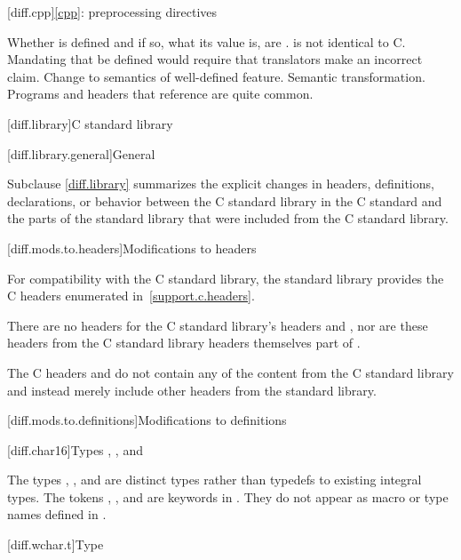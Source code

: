 [diff.cpp]{\ref{cpp}: preprocessing directives}

\change
Whether  is defined and if so, what its value is, are
.
\rationale
\Cpp{} is not identical to C\@.
Mandating that 
be defined would require that translators make an incorrect claim.
\effect
Change to semantics of well-defined feature.
\difficulty
Semantic transformation.
\howwide
Programs and headers that reference  are
quite common.

[diff.library]{C standard library}

[diff.library.general]{General}
%

\pnum
Subclause \ref{diff.library} summarizes the explicit changes in headers,
definitions, declarations, or behavior between the C standard library
in the C standard and the parts of the \Cpp{} standard library that were
included from the C standard library.

[diff.mods.to.headers]{Modifications to headers}

\pnum
For compatibility with the C standard library,
the \Cpp{} standard library provides the C headers enumerated
in~\ref{support.c.headers}.

\pnum
There are no \Cpp{} headers for the C standard library's headers
 and ,
nor are these headers from the C standard library headers themselves part of \Cpp{}.

\pnum
The C headers  and
 do not contain any of the content from
the C standard library and instead merely include other headers from the \Cpp{}
standard library.

[diff.mods.to.definitions]{Modifications to definitions}

[diff.char16]{Types , , and }

\pnum
The types , , and 
are distinct types rather than typedefs to existing integral types.
The tokens , , and 
are keywords in \Cpp{}.
They do not appear as macro or type names defined in
.

[diff.wchar.t]{Type }

